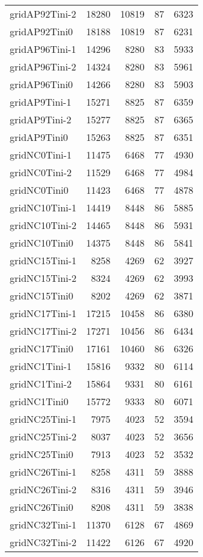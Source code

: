 \begin{longtable}{lrrrr}
gridAP92Tini-2 & 18280 & 10819 & 87 & 6323 \\
gridAP92Tini0 & 18188 & 10819 & 87 & 6231 \\
gridAP96Tini-1 & 14296 & 8280 & 83 & 5933 \\
gridAP96Tini-2 & 14324 & 8280 & 83 & 5961 \\
gridAP96Tini0 & 14266 & 8280 & 83 & 5903 \\
gridAP9Tini-1 & 15271 & 8825 & 87 & 6359 \\
gridAP9Tini-2 & 15277 & 8825 & 87 & 6365 \\
gridAP9Tini0 & 15263 & 8825 & 87 & 6351 \\
gridNC0Tini-1 & 11475 & 6468 & 77 & 4930 \\
gridNC0Tini-2 & 11529 & 6468 & 77 & 4984 \\
gridNC0Tini0 & 11423 & 6468 & 77 & 4878 \\
gridNC10Tini-1 & 14419 & 8448 & 86 & 5885 \\
gridNC10Tini-2 & 14465 & 8448 & 86 & 5931 \\
gridNC10Tini0 & 14375 & 8448 & 86 & 5841 \\
gridNC15Tini-1 & 8258 & 4269 & 62 & 3927 \\
gridNC15Tini-2 & 8324 & 4269 & 62 & 3993 \\
gridNC15Tini0 & 8202 & 4269 & 62 & 3871 \\
gridNC17Tini-1 & 17215 & 10458 & 86 & 6380 \\
gridNC17Tini-2 & 17271 & 10456 & 86 & 6434 \\
gridNC17Tini0 & 17161 & 10460 & 86 & 6326 \\
gridNC1Tini-1 & 15816 & 9332 & 80 & 6114 \\
gridNC1Tini-2 & 15864 & 9331 & 80 & 6161 \\
gridNC1Tini0 & 15772 & 9333 & 80 & 6071 \\
gridNC25Tini-1 & 7975 & 4023 & 52 & 3594 \\
gridNC25Tini-2 & 8037 & 4023 & 52 & 3656 \\
gridNC25Tini0 & 7913 & 4023 & 52 & 3532 \\
gridNC26Tini-1 & 8258 & 4311 & 59 & 3888 \\
gridNC26Tini-2 & 8316 & 4311 & 59 & 3946 \\
gridNC26Tini0 & 8208 & 4311 & 59 & 3838 \\
gridNC32Tini-1 & 11370 & 6128 & 67 & 4869 \\
gridNC32Tini-2 & 11422 & 6126 & 67 & 4920 \\

\end{longtable}
